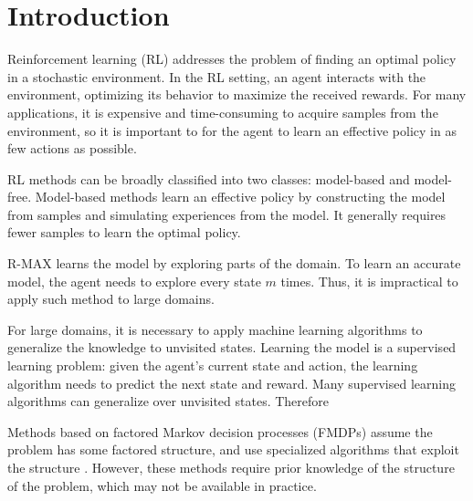 

\chapter{Introduction}
\label{ch:intro}

Reinforcement learning (RL) addresses the problem of finding an optimal policy in a stochastic environment.
In the RL setting, an agent interacts with the environment, optimizing its behavior to
maximize the received rewards. For many applications, it is expensive and time-consuming to 
acquire samples from the environment, so it is important to for the agent 
to learn an effective policy in as few actions as possible. 

RL methods can be broadly classified into two classes: model-based and
model-free.
Model-based methods learn an effective policy by
constructing the model from samples and simulating experiences from the model. It
generally requires fewer samples to learn the optimal policy.

R-MAX \cite{RMaxQ} learns the model by exploring parts of the domain.
To learn an accurate model, the agent needs to explore every state $m$ times.
Thus, it is impractical to apply such method to large domains.


For large domains, it is necessary to apply machine learning algorithms to generalize
the knowledge to unvisited states. Learning the model is a supervised learning problem:
given the agent's current state and action, the learning algorithm needs to predict
the next state and reward. Many supervised learning algorithms can generalize 
over unvisited states. Therefore  


Methods based on factored Markov decision processes (FMDPs) assume the problem has some factored structure, and use 
specialized algorithms that exploit the structure \cite{ApproxFactor, SPUDD}. 
However, these methods require prior knowledge
of the structure of the problem, which may not be available in practice.

